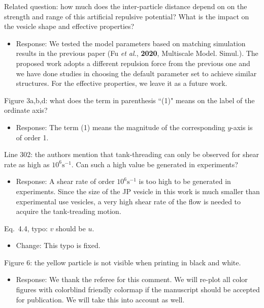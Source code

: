 \documentclass[11pt]{article}
\newcommand{\comment}[1]{{\color{blue} #1}}
\begin{document}
\noindent
\comment{Related question: how much does the inter-particle distance
depend on on the strength and range of this artificial repulsive
potential? What is the impact on the vesicle shape and effective
properties?}
\begin{itemize}
  \item Response: We tested the model parameters based on matching simulation results in the previous paper  (Fu {\sl et al.}, {\bf 2020}, Multiscale Model. Simul.). The proposed work adopts a different repulsion force from the previous one and we have done studies in choosing the default parameter set to achieve similar structures. For the effective properties, we leave it as a future work.
\end{itemize}

\noindent
\comment{Figure 3a,b,d: what does the term in parenthesis ``(1)" means
on the label of the ordinate axis?}
\begin{itemize}
  \item Response: The term (1) means the magnitude of the corresponding $y$-axis is of order 1.
\end{itemize}

\noindent
\comment{Line 302: the authors mention that tank-threading can only be
observed for shear rate as high as $10^{6}\text{s}^{-1}$. Can such a
high value be generated in experiments?}
\begin{itemize}
  \item Response: A shear rate of order $10^{6}\text{s}^{-1}$ is too high to be generated in experiments.
Since the size of the JP vesicle in this work is much smaller than experimental use vesicles, 
a very high shear rate of the flow is needed to acquire the tank-treading motion.
\end{itemize}

\noindent
\comment{Eq.~4.4, typo: $v$ should be $u$.}
\begin{itemize}
  \item Change: This typo is fixed.
\end{itemize}

\noindent
\comment{Figure 6: the yellow particle is not visible when printing in
black and white.}
\begin{itemize}
  \item Response: We thank the referee for this comment. We will re-plot all color figures with colorblind friendly colormap if the manuscript should be accepted for publication. We will take this into account as well.
\end{itemize}
\end{document}
